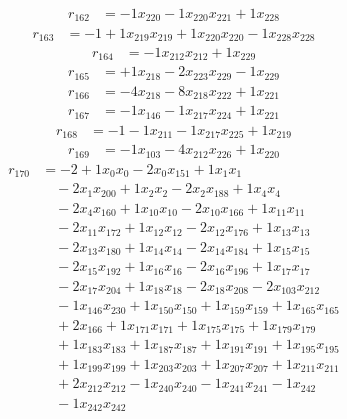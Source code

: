 \[\begin{aligned}
r_{162} &= - 1 x_{220} - 1 x_{220} x_{221} + 1 x_{228}
\end{aligned}\]
\[\begin{aligned}
r_{163} &= - 1 + 1 x_{219} x_{219} + 1 x_{220} x_{220} - 1 x_{228} x_{228}
\end{aligned}\]
\[\begin{aligned}
r_{164} &= - 1 x_{212} x_{212} + 1 x_{229}
\end{aligned}\]
\[\begin{aligned}
r_{165} &= + 1 x_{218} - 2 x_{223} x_{229} - 1 x_{229}
\end{aligned}\]
\[\begin{aligned}
r_{166} &= - 4 x_{218} - 8 x_{218} x_{222} + 1 x_{221}
\end{aligned}\]
\[\begin{aligned}
r_{167} &= - 1 x_{146} - 1 x_{217} x_{224} + 1 x_{221}
\end{aligned}\]
\[\begin{aligned}
r_{168} &= - 1 - 1 x_{211} - 1 x_{217} x_{225} + 1 x_{219}
\end{aligned}\]
\[\begin{aligned}
r_{169} &= - 1 x_{103} - 4 x_{212} x_{226} + 1 x_{220}
\end{aligned}\]
\[\begin{aligned}
r_{170} &= - 2 + 1 x_{0} x_{0} - 2 x_{0} x_{151} + 1 x_{1} x_{1} \\
 &\quad - 2 x_{1} x_{200} + 1 x_{2} x_{2} - 2 x_{2} x_{188} + 1 x_{4} x_{4} \\
 &\quad - 2 x_{4} x_{160} + 1 x_{10} x_{10} - 2 x_{10} x_{166} + 1 x_{11} x_{11} \\
 &\quad - 2 x_{11} x_{172} + 1 x_{12} x_{12} - 2 x_{12} x_{176} + 1 x_{13} x_{13} \\
 &\quad - 2 x_{13} x_{180} + 1 x_{14} x_{14} - 2 x_{14} x_{184} + 1 x_{15} x_{15} \\
 &\quad - 2 x_{15} x_{192} + 1 x_{16} x_{16} - 2 x_{16} x_{196} + 1 x_{17} x_{17} \\
 &\quad - 2 x_{17} x_{204} + 1 x_{18} x_{18} - 2 x_{18} x_{208} - 2 x_{103} x_{212} \\
 &\quad - 1 x_{146} x_{230} + 1 x_{150} x_{150} + 1 x_{159} x_{159} + 1 x_{165} x_{165} \\
 &\quad + 2 x_{166} + 1 x_{171} x_{171} + 1 x_{175} x_{175} + 1 x_{179} x_{179} \\
 &\quad + 1 x_{183} x_{183} + 1 x_{187} x_{187} + 1 x_{191} x_{191} + 1 x_{195} x_{195} \\
 &\quad + 1 x_{199} x_{199} + 1 x_{203} x_{203} + 1 x_{207} x_{207} + 1 x_{211} x_{211} \\
 &\quad + 2 x_{212} x_{212} - 1 x_{240} x_{240} - 1 x_{241} x_{241} - 1 x_{242} \\
 &\quad - 1 x_{242} x_{242}
\end{aligned}\]
